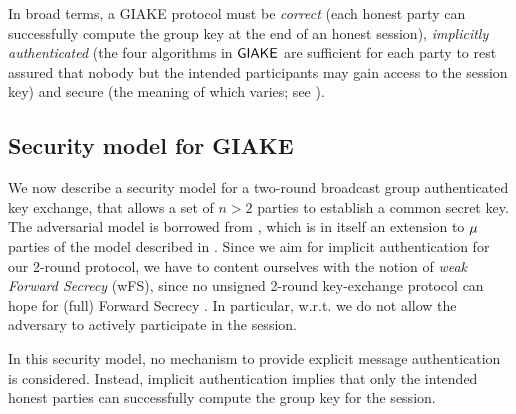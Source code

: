 	In broad terms, a GIAKE protocol must be \textit{correct} (each honest party can successfully compute the group key at the end of an honest session), \textit{implicitly authenticated} (the four algorithms in ${\mathsf{GIAKE}}$ are sufficient for each party to rest assured that nobody but the intended participants may gain access to the session key) and secure (the meaning of which varies; see ).

\subsection{Security model for GIAKE}\label{subsec:secmodel}
We now describe a security model for a two-round broadcast group authenticated key exchange, that allows a set of $n > 2$ parties to establish a common secret key.
The adversarial model is borrowed from \cite[Section 6.1]{PQR22}, which is in itself an extension to $\mu$ parties of the model described in \cite{JKRS20}.
Since we aim for implicit authentication for our 2-round protocol, we have to content ourselves with the notion of \textit{weak Forward Secrecy} (wFS), since no unsigned 2-round key-exchange protocol can hope for (full) Forward Secrecy \cite[Section 3.2]{HMQV}.
In particular, w.r.t. \cite[Section 6.1]{PQR22} we do not allow the adversary to actively participate in the session.

In this security model, no mechanism to provide explicit message authentication is considered.
Instead, implicit authentication implies that only the intended honest parties can successfully compute the group key for the session.

